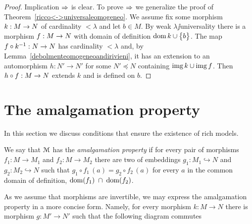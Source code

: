 \documentclass[creche.tex]{subfiles}
\begin{document}
\begin{proof} 
Implication $\Rightarrow$ is clear. To prove $\Rightarrow$ we generalize the proof of Theorem~\ref{ricco<->universaleomogeneo}. We assume  fix some morphism $k:M\rightarrow N$ of cardinality $<\lambda$ and let $b\in M$. By weak $\lambda\jj$universality there is a morphism $f:M\rightarrow N$ with domain of definition $\mathop{\rm dom} k\cup\big\{b\big\}$. The map $f\circ k^{-1}:N\rightarrow N$ has cardinality $<\lambda$ and, by Lemma~\ref{debolmenteomogeneoandirivieni}, it has an extension to an automorphism $h:N'\to N'$ for some $N'\preceq N$ containing $\mathop{\rm img} k\cup\mathop{\rm img} f$. Then $h\circ f:M\rightarrow N$ extends $k$ and is defined on $b$.
\end{proof}

\section{The amalgamation property}

In this section we discuss conditions that ensure the existence of rich models.

We say that $\EuScript M$ has the \emph{amalgamation property\/} if for every pair of morphisms $f_1:M\to M_1$ and $f_2:M\to M_2$ there are two of embeddings $g_1:M_1\hookrightarrow N$ and $g_2:M_2\hookrightarrow N$ such that $g_1\circ f_1\, (a) = g_2\circ f_2\, (a)$ for every $a$ in the common domain of definition, $\mathop{\rm dom} (f_1)\; \cap\; \mathop{\rm dom} (f_2)$.


\hfil{}

As we assume that morphisms are invertible, we may express the amalgamation property in a more concise form. Namely, for every morphism $k:M\to N$ there is morphism  $g:M'\to N'$ such that the following diagram commutes

\hfil{}
\end{document}
